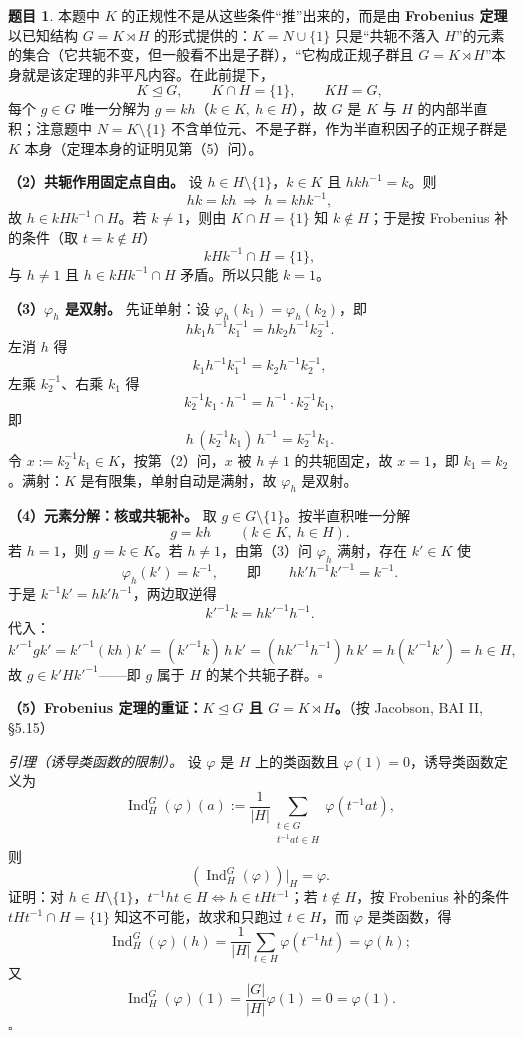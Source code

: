 \documentclass[a4paper]{ctexart}
\theoremstyle{definition}
\newtheorem{example}{题目}[section]
\theoremstyle{analysis}
\theoremstyle{plain}
\begin{document}
\begin{example}
本题中 \(K\) 的正规性不是从这些条件“推”出来的，而是由 \textbf{Frobenius 定理}以已知结构 \(G=K\rtimes H\) 的形式提供的：\(K=N\cup\{1\}\) 只是“共轭不落入 \(H\)”的元素的集合（它共轭不变，但一般看不出是子群），“它构成正规子群且 \(G=K\rtimes H\)”本身就是该定理的非平凡内容。在此前提下，
\[
  K\trianglelefteq G,\qquad K\cap H=\{1\},\qquad KH=G,
\]
每个 \(g\in G\) 唯一分解为 \(g=kh\)（\(k\in K,\ h\in H\)），故 \(G\) 是 \(K\) 与 \(H\) 的内部半直积；注意题中 \(N=K\setminus\{1\}\) 不含单位元、不是子群，作为半直积因子的正规子群是 \(K\) 本身（定理本身的证明见第（5）问）。

\textbf{（2）共轭作用固定点自由。} 设 \(h\in H\setminus\{1\}\)，\(k\in K\) 且 \(hkh^{-1}=k\)。则
\[
  hk=kh\ \Longrightarrow\ h=khk^{-1},
\]
故 \(h\in kHk^{-1}\cap H\)。若 \(k\neq 1\)，则由 \(K\cap H=\{1\}\) 知 \(k\notin H\)；于是按 Frobenius 补的条件（取 \(t=k\notin H\)）
\[
  kHk^{-1}\cap H=\{1\},
\]
与 \(h\neq 1\) 且 \(h\in kHk^{-1}\cap H\) 矛盾。所以只能 \(k=1\)。

\textbf{（3）\(\varphi_h\) 是双射。} 先证单射：设 \(\varphi_h(k_1)=\varphi_h(k_2)\)，即
\[
  hk_1h^{-1}k_1^{-1}=hk_2h^{-1}k_2^{-1}.
\]
左消 \(h\) 得
\[
  k_1h^{-1}k_1^{-1}=k_2h^{-1}k_2^{-1},
\]
左乘 \(k_2^{-1}\)、右乘 \(k_1\) 得
\[
  k_2^{-1}k_1\cdot h^{-1}=h^{-1}\cdot k_2^{-1}k_1,
\]
即
\[
  h\,(k_2^{-1}k_1)\,h^{-1}=k_2^{-1}k_1.
\]
令 \(x:=k_2^{-1}k_1\in K\)，按第（2）问，\(x\) 被 \(h\neq 1\) 的共轭固定，故 \(x=1\)，即 \(k_1=k_2\)。满射：\(K\) 是有限集，单射自动是满射，故 \(\varphi_h\) 是双射。

\textbf{（4）元素分解：核或共轭补。} 取 \(g\in G\setminus\{1\}\)。按半直积唯一分解
\[
  g=kh\qquad (k\in K,\ h\in H).
\]
若 \(h=1\)，则 \(g=k\in K\)。若 \(h\neq 1\)，由第（3）问 \(\varphi_h\) 满射，存在 \(k'\in K\) 使
\[
  \varphi_h(k')=k^{-1},\qquad \text{即}\qquad hk'h^{-1}k'^{-1}=k^{-1}.
\]
于是 \(k^{-1}k'=hk'h^{-1}\)，两边取逆得
\[
  k'^{-1}k=hk'^{-1}h^{-1}.
\]
代入：
\[
  k'^{-1}gk'
  =k'^{-1}(kh)k'
  =(k'^{-1}k)\,h\,k'
  =(hk'^{-1}h^{-1})\,h\,k'
  =h(k'^{-1}k')
  =h\in H,
\]
故 \(g\in k'Hk'^{-1}\)——即 \(g\) 属于 \(H\) 的某个共轭子群。\(\square\)

\textbf{（5）Frobenius 定理的重证：\(K\trianglelefteq G\) 且 \(G=K\rtimes H\)。}（按 Jacobson, BAI II, §5.15）

\emph{引理（诱导类函数的限制）。} 设 \(\varphi\) 是 \(H\) 上的类函数且 \(\varphi(1)=0\)，诱导类函数定义为
\[
  \operatorname{Ind}_H^G(\varphi)(a):=\frac{1}{|H|}\sum_{\substack{t\in G\\ t^{-1}at\in H}}\varphi(t^{-1}at),
\]
则
\[
  (\operatorname{Ind}_H^G(\varphi))\big|_H=\varphi.
\]
证明：对 \(h\in H\setminus\{1\}\)，\(t^{-1}ht\in H\iff h\in tHt^{-1}\)；若 \(t\notin H\)，按 Frobenius 补的条件 \(tHt^{-1}\cap H=\{1\}\) 知这不可能，故求和只跑过 \(t\in H\)，而 \(\varphi\) 是类函数，得
\[
  \operatorname{Ind}_H^G(\varphi)(h)=\frac{1}{|H|}\sum_{t\in H}\varphi(t^{-1}ht)=\varphi(h);
\]
又
\[
  \operatorname{Ind}_H^G(\varphi)(1)=\frac{|G|}{|H|}\varphi(1)=0=\varphi(1).
\]
\(\square\)


\end{example}
\end{document}
